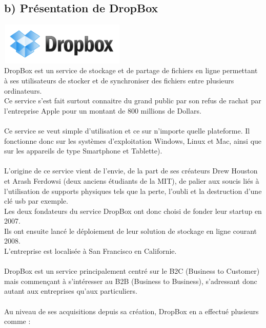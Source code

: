 \documentclass[a4paper, 10pt]{article}
\begin{document}
\subsection*{b) Présentation de DropBox}
\includegraphics[height = 2cm, width = 6cm]{jpg/dropbox_logo.png}\\
DropBox est un service de stockage et de partage de fichiers en ligne permettant à ses utilisateurs de stocker et
de synchroniser des fichiers entre plusieurs ordinateurs.\\
Ce service s'est fait surtout connaitre du grand public par son refus de rachat
par l'entreprise Apple pour un montant de 800 millions de Dollars.\\ \\
Ce service se veut simple d'utilisation et ce sur n'importe quelle plateforme.
Il fonctionne donc sur les systèmes d'exploitation Windows, Linux et Mac, ainsi que sur les appareils de type Smartphone et Tablette).\\ \\
L'origine de ce service vient de l'envie, de la part de ses créateurs Drew Houston et Arash Ferdowsi (deux anciens étudiants de la MIT),
de palier aux soucis liés à l'utilisation de supports physiques tels que la perte, l'oubli et la destruction d'une clé usb par exemple.\\
Les deux fondateurs du service DropBox ont donc choisi de fonder leur startup en 2007.\\
Ils ont ensuite lancé le déploiement de leur solution de stockage en ligne courant 2008.\\
L'entreprise est localisée à San Francisco en Californie.\\ \\
DropBox est un service principalement centré sur le B2C (Business to Customer) mais commençant à s'intéresser au B2B (Business to Business),
s'adressant donc autant aux entreprises qu'aux particuliers.\\ \\
Au niveau de ses acquisitions depuis sa création, DropBox en a effectué plusieurs comme :
\end{document}
